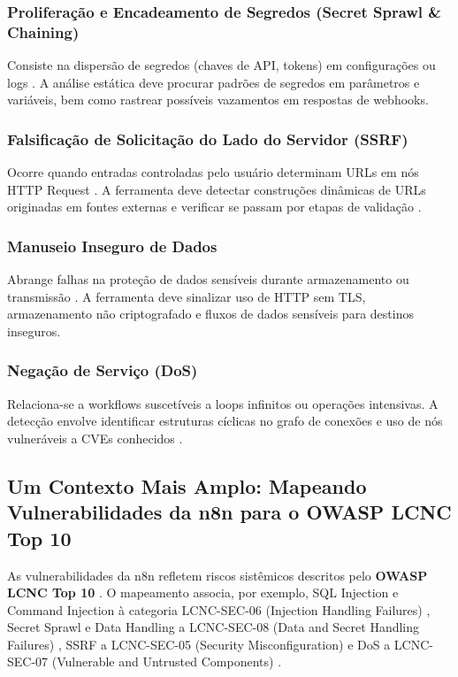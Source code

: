 \documentclass{sftex}
\begin{document}
\subsubsection{Proliferação e Encadeamento de Segredos (Secret Sprawl \& Chaining)}

Consiste na dispersão de segredos (chaves de API, tokens) em configurações ou logs \cite{gitguardian_secret_revocation}. A análise estática deve procurar padrões de segredos em parâmetros e variáveis, bem como rastrear possíveis vazamentos em respostas de webhooks.

\subsubsection{Falsificação de Solicitação do Lado do Servidor (SSRF)}

Ocorre quando entradas controladas pelo usuário determinam URLs em nós HTTP Request \cite{n8n_http_request}. A ferramenta deve detectar construções dinâmicas de URLs originadas em fontes externas e verificar se passam por etapas de validação \cite{ssrf_tutorial}.

\subsubsection{Manuseio Inseguro de Dados}

Abrange falhas na proteção de dados sensíveis durante armazenamento ou transmissão \cite{n8n_privacy_what_you_can_do}. A ferramenta deve sinalizar uso de HTTP sem TLS, armazenamento não criptografado e fluxos de dados sensíveis para destinos inseguros.

\subsubsection{Negação de Serviço (DoS)}

Relaciona-se a workflows suscetíveis a loops infinitos ou operações intensivas. A detecção envolve identificar estruturas cíclicas no grafo de conexões e uso de nós vulneráveis a CVEs conhecidos \cite{cve_2025_49595}.

\subsection{Um Contexto Mais Amplo: Mapeando Vulnerabilidades da n8n para o OWASP LCNC Top 10}

As vulnerabilidades da n8n refletem riscos sistêmicos descritos pelo \textbf{OWASP LCNC Top 10} \cite{owasp_lcnc_top10}. O mapeamento associa, por exemplo, SQL Injection e Command Injection à categoria LCNC-SEC-06 (Injection Handling Failures) \cite{owasp_lcnc_sec_06}, Secret Sprawl e Data Handling a LCNC-SEC-08 (Data and Secret Handling Failures) \cite{owasp_lcnc_sec_08}, SSRF a LCNC-SEC-05 (Security Misconfiguration) \cite{owasp_lcnc_sec_05} e DoS a LCNC-SEC-07 (Vulnerable and Untrusted Components) \cite{owasp_lcnc_sec_07}.
\end{document}
